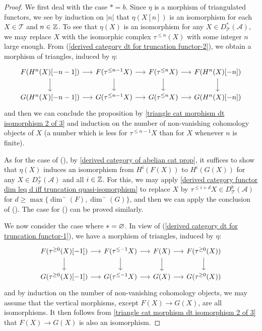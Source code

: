 \begin{proof}
We first deal with the case $*=b$. Since $\eta$ is a morphism of triangulated functors, we see by induction on $|n|$ that $\eta(X[n])$ is an isomorphism for each $X\in\mathcal{T}$ and $n\in\mathbb{Z}$. To see that $\eta(X)$ is an isomorphism for any $X\in D_\mathcal{T}^*(\mathcal{A})$, we may replace $X$ with the isomorphic complex $\tau^{\leq n}(X)$ with some integer $n$ large enough. From (\ref{derived category dt for truncation functor-2}), we obtain a morphism of triangles, induced by $\eta$:
\[\begin{tikzcd}[column sep=5mm]
F(H^n(X)[-n-1])\ar[r]\ar[d]&F(\tau^{\leq n-1}X)\ar[r]\ar[d]&F(\tau^{\leq n}X)\ar[r]\ar[d]&F(H^n(X)[-n])\ar[d]\\
G(H^n(X)[-n-1])\ar[r]&G(\tau^{\leq n-1}X)\ar[r]&G(\tau^{\leq n}X)\ar[r]&G(H^n(X)[-n])
\end{tikzcd}\]
and then we can conclude the proposition by \cref{triangle cat morphism dt isomorphism 2 of 3} and induction on the number of non-vanishing cohomology objects of $X$ (a number which is less for $\tau^{\leq n-1}X$ than for $X$ whenever $n$ is finite).\par
As for the case of (), by \cref{derived category of abelian cat prop}, it suffices to show that $\eta(X)$ induces an isomorphism from $H^i(F(X))$ to $H^i(G(X))$ for any $X\in D_\mathcal{T}^+(\mathcal{A})$ and all $i\in\mathbb{Z}$. For this, we may apply \cref{derived category functor dim leq d iff truncation quasi-isomorphism} to replace $X$ by $\tau^{\leq i+d}X\in D^b_\mathcal{T}(\mathcal{A})$ for $d\geq\max\{\dim^-(F),\dim^-(G)\}$, and then we can apply the conclusion of (). The case for () can be proved similarly.\par
We now consider the case where $*=\varnothing$. In view of (\ref{derived category dt for truncation functor-1}), we have a morphism of triangles, induced by $\eta$:
\[\begin{tikzcd}[column sep=5mm]
F(\tau^{\geq 0}(X)[-1])\ar[r]\ar[d]&F(\tau^{\leq-1}X)\ar[r]\ar[d]&F(X)\ar[r]\ar[d]&F(\tau^{\geq 0}(X))\ar[d]\\
G(\tau^{\geq 0}(X)[-1])\ar[r]&G(\tau^{\leq-1}X)\ar[r]&G(X)\ar[r]&G(\tau^{\geq 0}(X))
\end{tikzcd}\]
and by induction on the number of non-vanishing cohomology objects, we may assume that the vertical morphisms, except $F(X)\to G(X)$, are all isomorphisms. It then follows from \cref{triangle cat morphism dt isomorphism 2 of 3} that $F(X)\to G(X)$ is also an isomorphism.\par

\end{proof}
